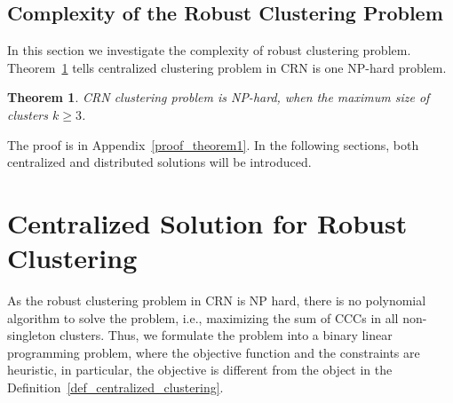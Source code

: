 \documentclass[10pt,journal,compsoc]{IEEEtran}
\theoremstyle{mytheoremstyle}
\newtheorem{theorem}{Theorem}[section]
\theoremstyle{mytheoremstyle}
\theoremstyle{mytheoremstyle}
\newcommand{\ie}{i.e., }
\begin{document}

\subsection{Complexity of the Robust Clustering Problem}
In this section we investigate the complexity of robust clustering problem.
Theorem~\ref{theorem1} tells centralized clustering problem in CRN is one NP-hard problem.

\begin{theorem}
\label{theorem1}
CRN clustering problem is NP-hard, when the maximum size of clusters $k\geqslant 3$.
\end{theorem}
The proof is in Appendix~\ref{proof_theorem1}.
In the following sections, both centralized and distributed solutions will be introduced.


\section{Centralized Solution for Robust Clustering}
\label{centralized_opt}
As the robust clustering problem in CRN is NP hard, there is no polynomial algorithm to solve the problem, \ie maximizing the sum of CCCs in all non-singleton clusters.
Thus, we formulate the problem into a binary linear programming problem, where the objective function and the constraints are heuristic, in particular, the objective is different from the object in the Definition~\ref{def_centralized_clustering}.

\end{document}
